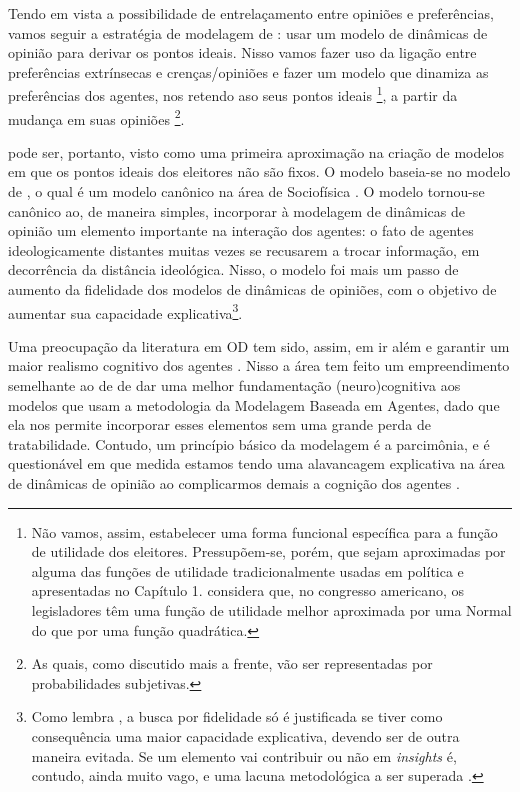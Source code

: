 

Tendo em vista a possibilidade de entrelaçamento entre opiniões e preferências,
vamos seguir a estratégia de modelagem de : usar
um modelo de dinâmicas de opinião para derivar os pontos ideais. Nisso vamos
fazer uso da ligação entre preferências extrínsecas e crenças/opiniões e fazer
um modelo que dinamiza as preferências dos agentes, nos retendo aso seus pontos ideais
\footnote{Não vamos, assim, estabelecer uma forma funcional específica para a
  função de utilidade dos eleitores. Pressupõem-se, porém, que sejam aproximadas
  por alguma das funções de utilidade tradicionalmente usadas em política e
  apresentadas no Capítulo 1.  considera que,
  no congresso americano, os legisladores têm uma função de utilidade melhor
  aproximada por uma Normal do que por uma função quadrática.}, a partir da
mudança em suas opiniões \footnote{As quais, como discutido mais a frente, vão
  ser representadas por probabilidades subjetivas.}.

 pode ser, portanto, visto como uma primeira
aproximação na criação de modelos em que os pontos ideais dos eleitores não são
fixos. O modelo baseia-se no modelo de , o qual é
um modelo canônico na área de Sociofísica \cite{galam1982sociophysics}. O modelo
tornou-se canônico ao, de maneira simples, incorporar à modelagem de dinâmicas
de opinião um elemento importante na interação dos agentes: o fato de agentes
ideologicamente distantes muitas vezes se recusarem a trocar informação, em
decorrência da distância ideológica. Nisso, o modelo foi mais um passo de
aumento da fidelidade dos modelos de dinâmicas de opiniões, com o objetivo de
aumentar sua capacidade  explicativa\footnote{Como lembra , a busca por
  fidelidade só é justificada se tiver como consequência uma maior capacidade
  explicativa, devendo ser de outra maneira evitada. Se um elemento vai
  contribuir ou não em \textit{insights} é, contudo, ainda muito vago, e uma
  lacuna metodológica a ser superada
  \cite{ragan2010embarrassment}.}. 

Uma preocupação da literatura em OD tem sido, assim, em ir além e garantir um
maior realismo cognitivo dos agentes \cite{duggins2014psychologically,homer2013complex,abrica2017effects}. Nisso a
área tem feito um empreendimento semelhante ao de
 de dar uma melhor fundamentação
(neuro)cognitiva aos modelos que usam a metodologia da Modelagem Baseada em
Agentes, dado que ela nos permite incorporar esses elementos sem uma grande
perda de tratabilidade. Contudo, um princípio básico da modelagem é a
parcimônia, e é questionável em que medida estamos tendo uma alavancagem
explicativa na área de dinâmicas de opinião ao complicarmos demais a cognição
dos agentes \cite{lave1993introduction,sznajd2014person}.

